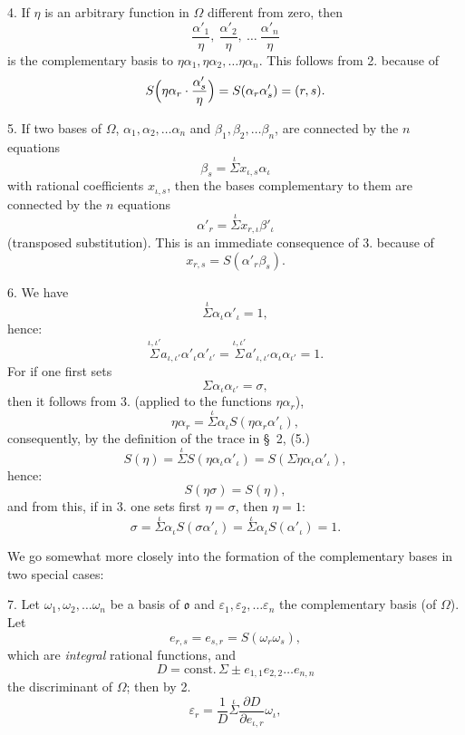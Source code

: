 \documentclass{article}
\begin{document}
4. If $\eta$ is an arbitrary function in $\Omega$ different from zero, then
\[ \frac{\alpha'_{1}}{\eta}, \ \frac{\alpha'_{2}}{\eta}, \ \ldots \ \frac{\alpha'_{n}}{\eta} \]
is the complementary basis to $\eta\alpha_{1}, \eta\alpha_{2}, \ldots \eta\alpha_{n}$. This follows from 2. because of
\[ S\Bigl(\eta\alpha_{r}\cdot\frac{\alpha'_{s}}{\eta}\Bigr) = S(\alpha_{r}\alpha'_{s}) = (r, s). \]


5. If two bases of $\Omega$, $\alpha_{1}, \alpha_{2}, \ldots \alpha_{n}$ and $\beta_{1}, \beta_{2}, \ldots \beta_{n}$, are connected by the $n$ equations
\[ \beta_{s} = \overset{\iota}{\Sigma} x_{\iota,s}\alpha_{\iota} \]
with rational coefficients $x_{\iota,s}$, then the bases complementary to them are connected by the $n$ equations
\[ \alpha'_{r} = \overset{\iota}{\Sigma} x_{r,\iota}\beta'_{\iota} \]
(transposed substitution). This is an immediate consequence of 3. because of
\[ x_{r,s} = S(\alpha'_{r}\beta_{s}). \]

6. We have
\[ \overset{\iota}{\Sigma}\alpha_{\iota}\alpha'_{\iota} = 1, \]
hence:
\[ \overset{\iota,\iota'}{\Sigma} a_{\iota,\iota'}\alpha'_{\iota}\alpha'_{\iota'} = \overset{\iota,\iota'}{\Sigma} a'_{\iota,\iota'}\alpha_{\iota}\alpha_{\iota'} = 1. \]
For if one first sets
\[ \Sigma\alpha_{\iota}\alpha_{\iota'} = \sigma, \]
then it follows from 3. (applied to the functions $\eta\alpha_{r}$),
\[ \eta\alpha_{r} = \overset{\iota}{\Sigma}\alpha_{\iota}S(\eta\alpha_{r}\alpha'_{\iota}), \]
consequently, by the definition of the trace in §~2, (5.)
\[ S(\eta) = \overset{\iota}{\Sigma} S(\eta\alpha_{\iota}\alpha'_{\iota}) = S(\Sigma\eta\alpha_{\iota}\alpha'_{\iota}), \]
hence:
\[ S(\eta\sigma) = S(\eta), \]
and from this, if in 3. one sets first $\eta = \sigma$, then $\eta = 1$:
\[ \sigma = \overset{\iota}{\Sigma}\alpha_{\iota}S(\sigma\alpha'_{\iota}) = \overset{\iota}{\Sigma}\alpha_{\iota}S(\alpha'_{\iota}) = 1. \]

We go somewhat more closely into the formation of the complementary bases in two special cases:

7. Let $\omega_{1}, \omega_{2}, \ldots \omega_{n}$ be a basis of $\mathfrak{o}$ and $\varepsilon_{1}, \varepsilon_{2}, \ldots \varepsilon_{n}$ the complementary basis (of $\Omega$). Let
\[ e_{r,s} = e_{s,r} = S(\omega_{r}\omega_{s}), \]
which are \emph{integral} rational functions, and
\[ D = \text{const.}\,\Sigma \pm e_{1,1}e_{2,2}\ldots e_{n,n} \]
the discriminant of $\Omega$; then by 2.
\[ \varepsilon_{r} = \frac{1}{D}\overset{\iota}{\Sigma}\frac{\partial D}{\partial e_{\iota,r}}\omega_{\iota}, \]
\end{document}
